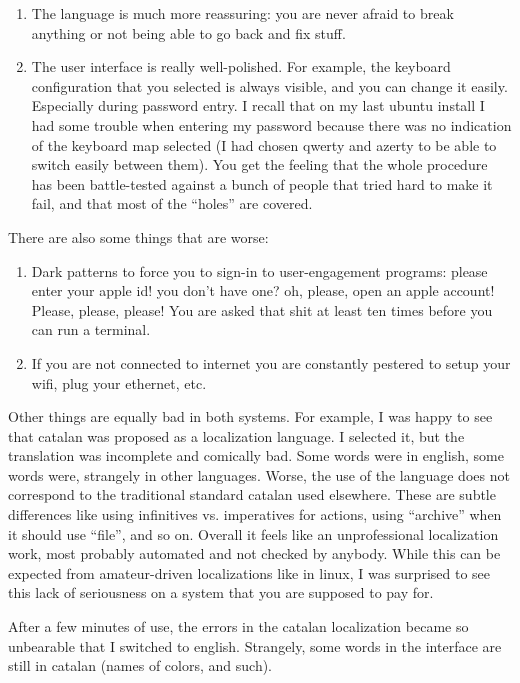 \begin{enumerate}
	\item The language is much more reassuring: you are never afraid to
		break anything or not being able to go back and fix stuff.
	\item The user interface is really well-polished.  For example, the
		keyboard configuration that you selected is always visible,
		and you can change it easily.  Especially during password
		entry.  I recall that on my last ubuntu install I had some
		trouble when entering my password because there was no
		indication of the keyboard map selected (I had chosen qwerty
		and azerty to be able to switch easily between them).
		You get the feeling that the whole procedure has been
		battle-tested against a bunch of people that tried hard to
		make it fail, and that most of the ``holes'' are covered.
\end{enumerate}


There are also some things that are worse:

\begin{enumerate}
	\item Dark patterns to force you to sign-in to user-engagement
		programs: please enter your apple id! you don't have one? oh,
		please, open an apple account!  Please, please, please!  You
		are asked that shit at least ten times before you can run a
		terminal.
	\item If you are not connected to internet you are constantly
		pestered to setup your wifi, plug your ethernet, etc.
\end{enumerate}

Other things are equally bad in both systems.  For example, I was happy to
see that catalan was proposed as a localization language.  I selected it, but
the translation was incomplete and comically bad.  Some words were in
english, some words were, strangely in other languages.  Worse, the use of
the language does not correspond to the traditional standard catalan used
elsewhere.  These are subtle differences like using infinitives vs.
imperatives for actions, using ``archive'' when it should use ``file'', and
so on.  Overall it feels like an unprofessional localization work, most
probably automated and not checked by anybody.  While this can be expected
from amateur-driven localizations like in linux, I was surprised to see this
lack of seriousness on a system that you are supposed to pay for.

After a few minutes of use, the errors in the catalan localization became so
unbearable that I switched to english.  Strangely, some words in the
interface are still in catalan (names of colors, and such).


